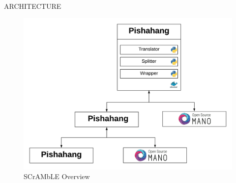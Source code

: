 \begin{frame}

\Huge{\centerline{ARCHITECTURE}}

\end{frame}


\begin{frame}

\begin{figure}
	\centering
	\includegraphics[width=1\linewidth]{images/plugin}
	\label{fig:plugin}
	{\\SCrAMbLE Overview}
\end{figure}


\end{frame}

